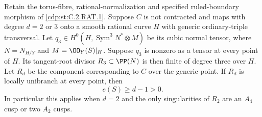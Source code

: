 
\begin{proposition}\label{cdp:st:C.2.RAT.5}
Retain the torus-fibre, rational-normalization and specified
ruled-boundary morphism of \ref{cdp:st:C.2.RAT.1}. Suppose $C$ is not
contracted and maps with degree $d=2$ or $3$ onto a smooth
rational curve $H$ with generic ordinary-triple transversal.
Let $q_3\in H^0(H,\operatorname{Sym}^3N^*\otimes M)$ be
its cubic normal tensor, where $N=N_{H/Y}$ and
$M=\OO_Y(S)|_H$. Suppose $q_3$ is nonzero as a tensor at
every point of $H$. Its tangent-root divisor
$R_3\subset\PP(N)$ is then finite of degree three over $H$.
Let $R_d$ be the component corresponding to $C$ over the
generic point. If $R_d$ is locally unibranch at every point,
then
\[
                           e(S)\ge d-1>0.
\tag{C.RD.1}\label{cdp:eq:C.RD.1}
\]
In particular this applies when $d=2$ and the only singularities
of $R_2$ are an $A_4$ cusp or two $A_2$ cusps.
\end{proposition}
